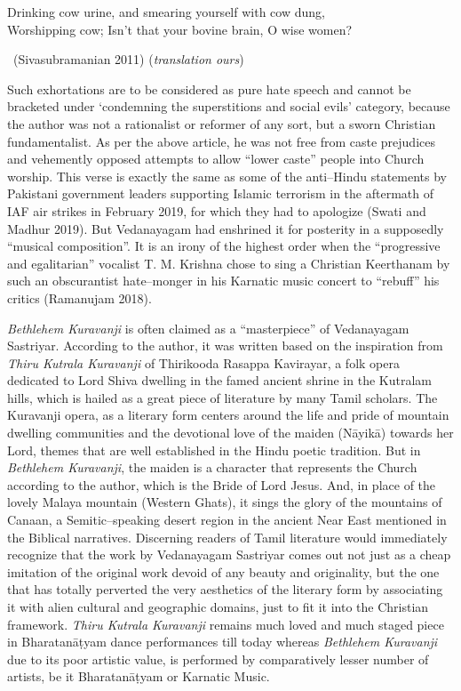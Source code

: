 \begin{myquote}
Drinking cow urine, and smearing yourself with cow dung,\\ Worshipping cow; Isn’t that your bovine brain, O wise women? 

~\hfill (Sivasubramanian 2011) (\textit{translation ours})
\end{myquote}

Such exhortations are to be considered as pure hate speech and cannot be bracketed under ‘condemning the superstitions and social evils’ category, because the author was not a rationalist or reformer of any sort, but a sworn Christian fundamentalist. As per the above article, he was not free from caste prejudices and vehemently opposed attempts to allow “lower caste” people into Church worship. This verse is exactly the same as some of the anti–Hindu statements by Pakistani government leaders supporting Islamic terrorism in the aftermath of IAF air strikes in February 2019, for which they had to apologize (Swati and Madhur 2019). But Vedanayagam had enshrined it for posterity in a supposedly “musical composition”. It is an irony of the highest order when the “progressive and egalitarian” vocalist T. M. Krishna chose to sing a Christian Keerthanam by such an obscurantist hate–monger in his Karnatic music concert to “rebuff” his critics (Ramanujam 2018).

\textit{Bethlehem Kuravanji} is often claimed as a “masterpiece” of Vedanayagam Sastriyar. According to the author, it was written based on the inspiration from \textit{Thiru Kutrala Kuravanji} of Thirikooda Rasappa Kavirayar, a folk opera dedicated to Lord Shiva dwelling in the famed ancient shrine in the Kutralam hills, which is hailed as a great piece of literature by many Tamil scholars. The Kuravanji opera, as a literary form centers around the life and pride of mountain dwelling communities and the devotional love of the maiden (Nāyikā) towards her Lord, themes that are well established in the Hindu poetic tradition. But in \textit{Bethlehem Kuravanji}, the maiden is a character that represents the Church according to the author, which is the Bride of Lord Jesus. And, in place of the lovely Malaya mountain (Western Ghats), it sings the glory of the mountains of Canaan, a Semitic–speaking desert region in the ancient Near East mentioned in the Biblical narratives. Discerning readers of Tamil literature would immediately recognize that the work by Vedanayagam Sastriyar comes out not just as a cheap imitation of the original work devoid of any beauty and originality, but the one that has totally perverted the very aesthetics of the literary form by associating it with alien cultural and geographic domains, just to fit it into the Christian framework. \textit{Thiru Kutrala Kuravanji }remains much loved and much staged piece in Bharatanāṭyam dance performances till today whereas \textit{Bethlehem Kuravanji }due to its poor artistic value, is performed by comparatively lesser number of artists, be it Bharatanāṭyam or Karnatic Music.

